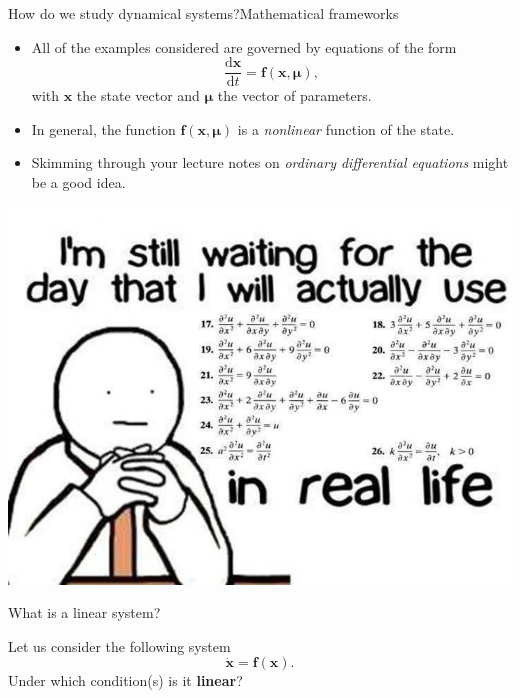 \documentclass[usenames,dvipsnames,svgnames,10pt,aspectratio=169]{beamer}
\begin{document}
\begin{frame}[t, c]{How do we study dynamical systems?}{Mathematical frameworks}
	\begin{minipage}{.48\textwidth}
		\begin{itemize}
			\item All of the examples considered are governed by equations of the form
			\[
				\frac{\mathrm{d}\bm{x}}{\mathrm{d}t} = \bm{f}\left(	\bm{x}, \boldsymbol{\mu} \right),
			\]
			with \(\bm{x}\) the state vector and \(\boldsymbol{\mu}\) the vector of parameters.

			\medskip

			\item In general, the function \( \bm{f}\left( \bm{x}, \boldsymbol{\mu} \right)\) is a \emph{nonlinear} function of the state.

			\medskip

			\item Skimming through your lecture notes on \emph{ordinary differential equations} might be a good idea.
		\end{itemize}
	\end{minipage}%
	\hfill
	\begin{minipage}{.48\textwidth}
		\centering
		\includegraphics[width=\textwidth]{still_waiting}
	\end{minipage}

	\vspace{1cm}
\end{frame}

\begin{frame}[t, c]{What is a linear system?}{}
	\centering

	\begin{block}{}
		\centering
		Let us consider the following system
		\[
			\dot{\bm x} = {\bm f}({\bm x}).
		\]
		Under which condition(s) is it \alert{\textbf{linear}}?
	\end{block}

	\vspace{1cm}
\end{frame}
\end{document}
